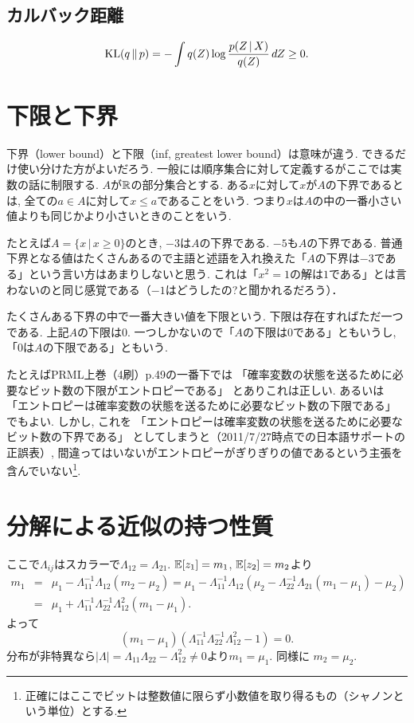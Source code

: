 \subsection{カルバック距離}
$$
\mathop{\mathrm{KL}}\nolimits(q\,\|\,p)=-\int q(Z) \log \frac{p(Z\,|\,X)}{q(Z)}\,dZ \ge 0.
$$
\vspace{0pt}

\section{下限と下界}\label{lower_bound}
下界（lower bound）と下限（inf, greatest lower bound）は意味が違う.
できるだけ使い分けた方がよいだろう. 一般には順序集合に対して定義するがここでは実数の話に制限する.
$A$が$\mathbb{R}$の部分集合とする. ある$x$に対して$x$が$A$の下界であるとは, 全ての$a\in A$に対して$x \le a$であることをいう.
つまり$x$は$A$の中の一番小さい値よりも同じかより小さいときのことをいう.

たとえば$A=\{x\,|\,x\ge 0\}$のとき, $-3$は$A$の下界である. $-5$も$A$の下界である.
普通下界となる値はたくさんあるので主語と述語を入れ換えた「$A$の下界は$-3$である」という言い方はあまりしないと思う.
これは「$x^2=1$の解は$1$である」とは言わないのと同じ感覚である（$-1$はどうしたの?と聞かれるだろう）．

たくさんある下界の中で一番大きい値を下限という. 下限は存在すればただ一つである.
上記$A$の下限は$0$. 一つしかないので「$A$の下限は$0$である」ともいうし, 「0は$A$の下限である」ともいう.

たとえばPRML上巻（4刷）p.49の一番下では
「確率変数の状態を送るために必要なビット数の下限がエントロピーである」
とありこれは正しい. あるいは
「エントロピーは確率変数の状態を送るために必要なビット数の下限である」
でもよい. しかし, これを
「エントロピーは確率変数の状態を送るために必要なビット数の下界である」
としてしまうと（2011/7/27時点での日本語サポートの正誤表）,
間違ってはいないがエントロピーがぎりぎりの値であるという主張を含んでいない\footnote{正確にはここでビットは整数値に限らず小数値を取り得るもの（シャノンという単位）とする.}.

\section{分解による近似の持つ性質}
ここで$\Lambda_{ij}$はスカラーで$\Lambda_{12}=\Lambda_{21}$.
$\mathbb{E}[z_1] = m_1$, $\mathbb{E}[z_2] = m_2$より
\begin{eqnarray*}
m_1 &=& \mu_1 - \Lambda_{11}^{-1}\Lambda_{12}(m_2 - \mu_2)
    = \mu_1 - \Lambda_{11}^{-1}\Lambda_{12}(\mu_2 - \Lambda_{22}^{-1}\Lambda_{21}(m_1-\mu_1) - \mu_2) \\
    &=& \mu_1 + \Lambda_{11}^{-1}\Lambda_{22}^{-1}\Lambda_{12}^2(m_1-\mu_1).
\end{eqnarray*}
よって
$$
(m_1-\mu_1)(\Lambda_{11}^{-1}\Lambda_{22}^{-1}\Lambda_{12}^2-1)=0.
$$
分布が非特異なら$|\Lambda|=\Lambda_{11}\Lambda_{22}-\Lambda_{12}^2 \ne0$より$m_1=\mu_1$. 同様に $m_2=\mu_2$.

